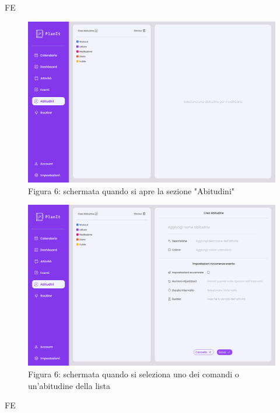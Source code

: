 \begin{listaPersonale}{FE}
    \begin{figure}[H]
        \centering
        \includegraphics[width=1\textwidth]{img/FrontEnd/Abitudini/Abitudini.png}
        \caption{Figura 6: schermata quando si apre la sezione "Abitudini"}
    \end{figure}

    \begin{figure}[H]
        \centering
        \includegraphics[width=1\textwidth]{img/FrontEnd/Abitudini/CreaAbitudiniMain.png}
        \caption{Figura 6: schermata quando si seleziona uno dei comandi o un'abitudine della lista}
    \end{figure}

    \begin{listaPersonale2}{FE}
        

\end{listaPersonale2}
\end{listaPersonale}
